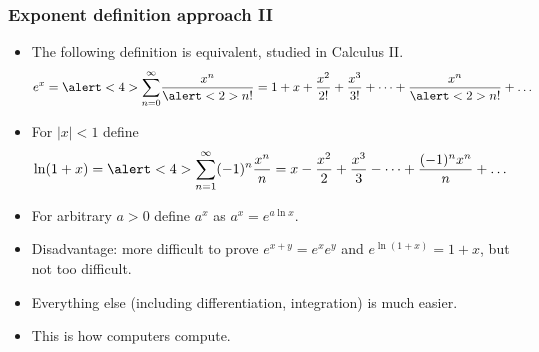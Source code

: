\begin{frame}
\frametitle{Exponent definition approach II }
\begin{itemize}
\item<1-> The following definition is equivalent, studied in Calculus II.
\[
e^{x}=\alert<4>{\sum_{n=0}^{\infty}} \frac{x^n}{\alert<2>{n!}}= 1+ x+\frac{x^2}{2!}+\frac{x^3}{3!}+\dots + \frac{x^{n}}{\alert<2>{n!}}+\dots
\]
\item<3-> For $|x|<1$ define 
\[
\ln (1+x)=\alert<4>{\sum_{n=1}^{\infty}} (-1)^n\frac{x^n}{n}=  x-\frac{x^2}{2}+\frac{x^3}{3}-\dots + \frac{(-1)^nx^{n}}{n}+\dots
\]
\item<5-> For arbitrary $a>0$ define $a^x$ as $a^x=e^{a\ln x}$. 
\item<6-> Disadvantage: more difficult to prove $e^{x+y}=e^{x}e^y$ and $e^{\ln(1+x)}=1+x$, but not too difficult.
\item<7-> Everything else (including differentiation, integration) is much easier.
\item<8-> This is how computers compute.
\end{itemize}
\end{frame}

